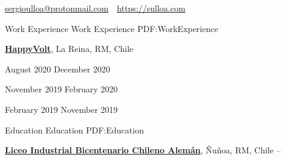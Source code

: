 \documentclass[letterpaper,yyyy,draft]{simpleresumecv}
\newcommand{\CVAuthor}{Sergio A. Ulloa B.}
\newcommand{\CVWebpage}{https://sulloa.com}
\begin{document}
\makeatletter
\let\@oddfoot\@empty{}
\let\@evenfoot\@empty{}
\makeatother

\Title{\CVAuthor}

{
    \begin{SubTitle}
    \href{mailto:sergioulloa@protonmail.com}{sergioulloa@protonmail.com}
    \,\SubBulletSymbol\,
    \href{\CVWebpage}{\url{\CVWebpage}}
    \end{SubTitle}
}

\begin{Body}


\Section
{Work\newline
Experience}
{Work Experience}
{PDF:WorkExperience}
{
    \Entry{}
    \href{https://happyvolt.com/}{\textbf{HappyVolt}},
    La Reina, RM, Chile

    \hfill
    August 2020
    December 2020

    \hfill
    November 2019
    February 2020

    \hfill
    February 2019
    November 2019

    \hfill
    \begin{Detail}


    \end{Detail}


    \begin{Detail}
    \end{Detail}
}


\Section
{Education}
{Education}
{PDF:Education}
{
    \Entry{}
    \href{https://www.lichan.cl/}{\textbf{Liceo Industrial Bicentenario Chileno Alemán}},
    Ñuñoa, RM, Chile
    \hfill
     -- 

}
\end{Body}
\end{document}
